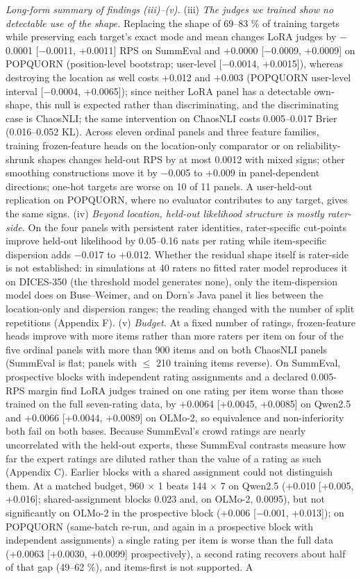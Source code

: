 \documentclass{article}
\begin{document}
\emph{Long-form summary of findings (iii)--(v).} (iii) \emph{The judges we trained show no detectable use of the shape.} Replacing the shape of 69--83 \% of training targets while preserving each target's exact mode and mean changes LoRA judges by $-$0.0001 {[}$-$0.0011, +0.0011{]} RPS on SummEval and +0.0000 {[}$-$0.0009, +0.0009{]} on POPQUORN (position-level bootstrap; user-level {[}$-$0.0014, +0.0015{]}), whereas destroying the location as well costs +0.012 and +0.003 (POPQUORN user-level interval {[}$-$0.0004, +0.0065{]}); since neither LoRA panel has a detectable own-shape, this null is expected rather than discriminating, and the discriminating case is ChaosNLI; the same intervention on ChaosNLI costs 0.005--0.017 Brier (0.016--0.052 KL). Across eleven ordinal panels and three feature families, training frozen-feature heads on the location-only comparator or on reliability-shrunk shapes changes held-out RPS by at most 0.0012 with mixed signs; other smoothing constructions move it by $-$0.005 to +0.009 in panel-dependent directions; one-hot targets are worse on 10 of 11 panels. A user-held-out replication on POPQUORN, where no evaluator contributes to any target, gives the same signs. (iv) \emph{Beyond location, held-out likelihood structure is mostly rater-side.} On the four panels with persistent rater identities, rater-specific cut-points improve held-out likelihood by 0.05--0.16 nats per rating while item-specific dispersion adds $-$0.017 to +0.012. Whether the residual shape itself is rater-side is not established: in simulations at 40 raters no fitted rater model reproduces it on DICES-350 (the threshold model generates none), only the item-dispersion model does on Buse--Weimer, and on Dorn's Java panel it lies between the location-only and dispersion ranges; the reading changed with the number of split repetitions (Appendix F). (v) \emph{Budget.} At a fixed number of ratings, frozen-feature heads improve with more items rather than more raters per item on four of the five ordinal panels with more than 900 items and on both ChaosNLI panels (SummEval is flat; panels with $\leq$ 210 training items reverse). On SummEval, prospective blocks with independent rating assignments and a declared 0.005-RPS margin find LoRA judges trained on one rating per item worse than those trained on the full seven-rating data, by +0.0064 {[}+0.0045, +0.0085{]} on Qwen2.5 and +0.0066 {[}+0.0044, +0.0089{]} on OLMo-2, so equivalence and non-inferiority both fail on both bases. Because SummEval's crowd ratings are nearly uncorrelated with the held-out experts, these SummEval contrasts measure how far the expert ratings are diluted rather than the value of a rating as such (Appendix C). Earlier blocks with a shared assignment could not distinguish them. At a matched budget, 960 $\times$ 1 beats 144 $\times$ 7 on Qwen2.5 (+0.010 {[}+0.005, +0.016{]}; shared-assignment blocks 0.023 and, on OLMo-2, 0.0095), but not significantly on OLMo-2 in the prospective block (+0.006 {[}$-$0.001, +0.013{]}); on POPQUORN (same-batch re-run, and again in a prospective block with independent assignments) a single rating per item is worse than the full data (+0.0063 {[}+0.0030, +0.0099{]} prospectively), a second rating recovers about half of that gap (49--62 \%), and items-first is not supported. A 
\end{document}
